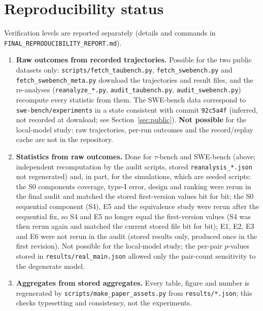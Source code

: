 \section{Reproducibility status}\label{app:repro}
Verification levels are reported separately (details and commands in \texttt{FINAL\_REPRODUCIBILITY\_REPORT.md}).
\begin{enumerate}
\item \textbf{Raw outcomes from recorded trajectories.} Possible for the two public datasets only: \texttt{scripts/fetch\_taubench.py}, \texttt{fetch\_swebench.py} and \texttt{fetch\_swebench\_meta.py} download the trajectories and result files, and the re-analyses (\texttt{reanalyze\_*.py}, \texttt{audit\_taubench.py}, \texttt{audit\_swebench.py}) recompute every statistic from them. The SWE-bench data correspond to \texttt{swe-bench/experiments} in a state consistent with commit \texttt{92c5a4f} (inferred, not recorded at download; see Section~\ref{sec:public}). \textbf{Not possible} for the local-model study: raw trajectories, per-run outcomes and the record/replay cache are not in the repository.
\item \textbf{Statistics from raw outcomes.} Done for $\tau$-bench and SWE-bench (above; independent recomputation by the audit scripts, stored \texttt{reanalysis\_*.json} not regenerated) and, in part, for the simulations, which are seeded scripts: the S0 components coverage, type-I error, design and ranking were rerun in the final audit and matched the stored first-version values bit for bit; the S0 sequential component (S4), E5 and the equivalence study were rerun after the sequential fix, so S4 and E5 no longer equal the first-version values (S4 was then rerun again and matched the current stored file bit for bit); E1, E2, E3 and E6 were not rerun in the audit (stored results only, produced once in the first revision). Not possible for the local-model study; the per-pair $p$-values stored in \texttt{results/real\_main.json} allowed only the pair-count sensitivity to the degenerate model.
\item \textbf{Aggregates from stored aggregates.} Every table, figure and number is regenerated by \texttt{scripts/make\_paper\_assets.py} from \texttt{results/*.json}; this checks typesetting and consistency, not the experiments.

\end{enumerate}
